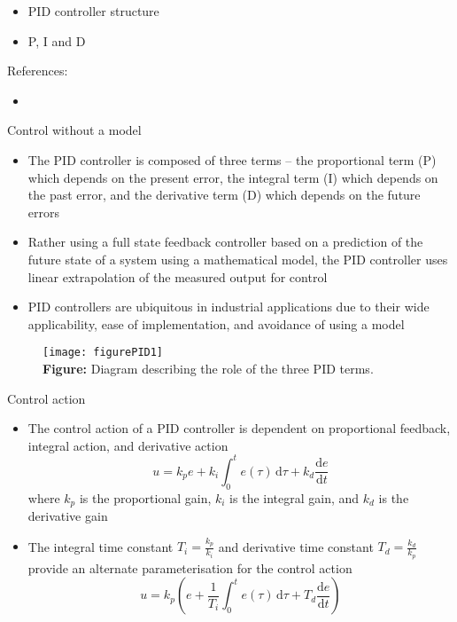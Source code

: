 \documentclass{beamer-control}
\begin{document}

\begin{SUMMARY}
\begin{itemize}
\item PID controller structure
\item P, I and D
\end{itemize}
\vfill References:
\begin{itemize}
\item {}
\end{itemize}
\end{SUMMARY}




\begin{frame}{Control without a model}
\begin{itemize}
\item The PID controller is composed of three terms -- the proportional term (P) which depends on the present error, the integral term (I) which depends on the past error, and the derivative term (D) which depends on the future errors
\item Rather using a full state feedback controller based on a prediction of the future state of a system using a mathematical model, the PID controller uses linear extrapolation of the measured output for control
\item PID controllers are ubiquitous in industrial applications due to their wide applicability, ease of implementation, and avoidance of using a model
\end{itemize}
\end{frame}

\begin{frame}
\begin{figure}
	\centering
	\texttt{[image: figurePID1]}
	\\
	\textbf{Figure:} Diagram describing the role of the three PID terms. 
\end{figure}
\end{frame}

\begin{frame}{Control action}
\begin{itemize}
	\item The control action of a PID controller is dependent on proportional feedback, integral action, and derivative action
	\[u=k_{p} e+k_{i} \int_0^t e(\tau) \, \mathrm{d} \tau+k_{d} \frac{\mathrm{d} e}{\mathrm{d} t}\]
	where $k_p$ is the proportional gain, $k_i$ is the integral gain, and $k_d$ is the derivative gain
	\item The integral time constant $T_i=\tfrac{k_p}{k_i}$ and derivative time constant $T_d = \tfrac{k_d}{k_p}$ provide an alternate parameterisation for the control action
	\[u = k_{p}\left(e+\frac{1}{T_{i}} \int_0^t e(\tau) \, \mathrm{d} \tau+T_{d} \frac{\mathrm{d} e}{\mathrm{d} t}\right)\]
\end{itemize}

\end{frame}
\end{document}
